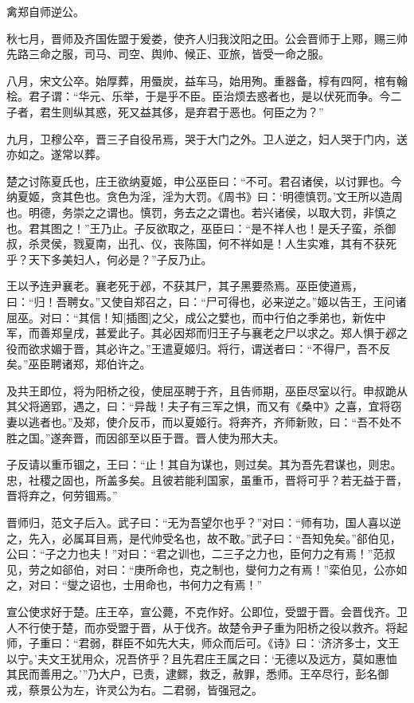 \documentclass[a4paper,12pt,UTF8,twoside]{ctexbook}
\begin{document}
禽郑自师逆公。

秋七月，晋师及齐国佐盟于爰娄，使齐人归我汶阳之田。公会晋师于上鄍，赐三帅先路三命之服，司马、司空、舆帅、候正、亚旅，皆受一命之服。

八月，宋文公卒。始厚葬，用蜃炭，益车马，始用殉。重器备，椁有四阿，棺有翰桧。君子谓：“华元、乐举，于是乎不臣。臣治烦去惑者也，是以伏死而争。今二子者，君生则纵其惑，死又益其侈，是弃君于恶也。何臣之为？”

九月，卫穆公卒，晋三子自役吊焉，哭于大门之外。卫人逆之，妇人哭于门内，送亦如之。遂常以葬。

楚之讨陈夏氏也，庄王欲纳夏姬，申公巫臣曰：“不可。君召诸侯，以讨罪也。今纳夏姬，贪其色也。贪色为淫，淫为大罚。《周书》曰：‘明德慎罚。’文王所以造周也。明德，务崇之之谓也。慎罚，务去之之谓也。若兴诸侯，以取大罚，非慎之也。君其图之！”王乃止。子反欲取之，巫臣曰：“是不祥人也！是夭子蛮，杀御叔，杀灵侯，戮夏南，出孔、仪，丧陈国，何不祥如是！人生实难，其有不获死乎？天下多美妇人，何必是？”子反乃止。

王以予连尹襄老。襄老死于邲，不获其尸，其子黑要烝焉。巫臣使道焉，曰：“归！吾聘女。”又使自郑召之，曰：“尸可得也，必来逆之。”姬以告王，王问诸屈巫。对曰：“其信！知[插图]之父，成公之嬖也，而中行伯之季弟也，新佐中军，而善郑皇戌，甚爱此子。其必因郑而归王子与襄老之尸以求之。郑人惧于邲之役而欲求媚于晋，其必许之。”王遣夏姬归。将行，谓送者曰：“不得尸，吾不反矣。”巫臣聘诸郑，郑伯许之。

及共王即位，将为阳桥之役，使屈巫聘于齐，且告师期，巫臣尽室以行。申叔跪从其父将適郢，遇之，曰：“异哉！夫子有三军之惧，而又有《桑中》之喜，宜将窃妻以逃者也。”及郑，使介反币，而以夏姬行。将奔齐，齐师新败，曰：“吾不处不胜之国。”遂奔晋，而因郤至以臣于晋。晋人使为邢大夫。

子反请以重币锢之，王曰：“止！其自为谋也，则过矣。其为吾先君谋也，则忠。忠，社稷之固也，所盖多矣。且彼若能利国家，虽重币，晋将可乎？若无益于晋，晋将弃之，何劳锢焉。”

晋师归，范文子后入。武子曰：“无为吾望尔也乎？”对曰：“师有功，国人喜以逆之，先入，必属耳目焉，是代帅受名也，故不敢。”武子曰：“吾知免矣。”郤伯见，公曰：“子之力也夫！”对曰：“君之训也，二三子之力也，臣何力之有焉！”范叔见，劳之如郤伯，对曰：“庚所命也，克之制也，燮何力之有焉！”栾伯见，公亦如之，对曰：“燮之诏也，士用命也，书何力之有焉！”

宣公使求好于楚。庄王卒，宣公薨，不克作好。公即位，受盟于晋。会晋伐齐。卫人不行使于楚，而亦受盟于晋，从于伐齐。故楚令尹子重为阳桥之役以救齐。将起师，子重曰：“君弱，群臣不如先大夫，师众而后可。《诗》曰：‘济济多士，文王以宁。’夫文王犹用众，况吾侪乎？且先君庄王属之曰：‘无德以及远方，莫如惠恤其民而善用之。’”乃大户，已责，逮鳏，救乏，赦罪，悉师。王卒尽行，彭名御戎，蔡景公为左，许灵公为右。二君弱，皆强冠之。
\end{document}
